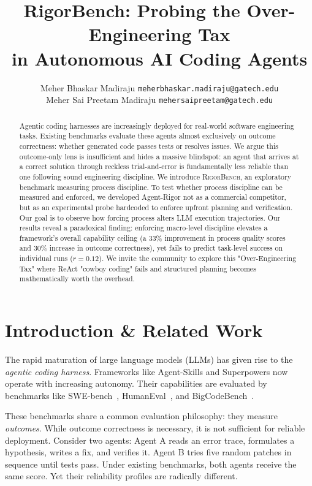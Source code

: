 \documentclass[letterpaper, 10 pt, conference]{ieeeconf}
\title{\LARGE \bf
  RigorBench: Probing the Over-Engineering Tax \\
  in Autonomous AI Coding Agents
}
\author{ \parbox{3 in}{ \centering Meher Bhaskar Madiraju
        {\tt\small meherbhaskar.madiraju@gatech.edu}}
        \hspace*{ 0.5 in}
        \parbox{3 in}{\centering Meher Sai Preetam Madiraju
        {\tt\small mehersaipreetam@gatech.edu}}
}
\newcommand{\bench}{\textsc{RigorBench}}
\begin{document}
\maketitle
\thispagestyle{empty}
\pagestyle{empty}

\begin{abstract}
Agentic coding harnesses are increasingly deployed for real-world software engineering tasks. Existing benchmarks evaluate these agents almost exclusively on outcome correctness: whether generated code passes tests or resolves issues. We argue this outcome-only lens is insufficient and hides a massive blindspot: an agent that arrives at a correct solution through reckless trial-and-error is fundamentally less reliable than one following sound engineering discipline. We introduce \bench{}, an exploratory benchmark measuring process discipline. To test whether process discipline can be measured and enforced, we developed Agent-Rigor not as a commercial competitor, but as an experimental probe hardcoded to enforce upfront planning and verification. Our goal is to observe how forcing process alters LLM execution trajectories. Our results reveal a paradoxical finding: enforcing macro-level discipline elevates a framework's overall capability ceiling (a 33\% improvement in process quality scores and 30\% increase in outcome correctness), yet fails to predict task-level success on individual runs ($r=0.12$). We invite the community to explore this "Over-Engineering Tax" where ReAct "cowboy coding" fails and structured planning becomes mathematically worth the overhead.
\end{abstract}

\section{Introduction \& Related Work}
The rapid maturation of large language models (LLMs) has given rise to the \emph{agentic coding harness}. Frameworks like Agent-Skills and Superpowers now operate with increasing autonomy. Their capabilities are evaluated by benchmarks like SWE-bench~\cite{jimenez2024swebench}, HumanEval~\cite{chen2021evaluating}, and BigCodeBench~\cite{zhuo2024bigcodebench}. 

These benchmarks share a common evaluation philosophy: they measure \emph{outcomes}. While outcome correctness is necessary, it is not sufficient for reliable deployment. Consider two agents: Agent A reads an error trace, formulates a hypothesis, writes a fix, and verifies it. Agent B tries five random patches in sequence until tests pass. Under existing benchmarks, both agents receive the same score. Yet their reliability profiles are radically different.
\end{document}
